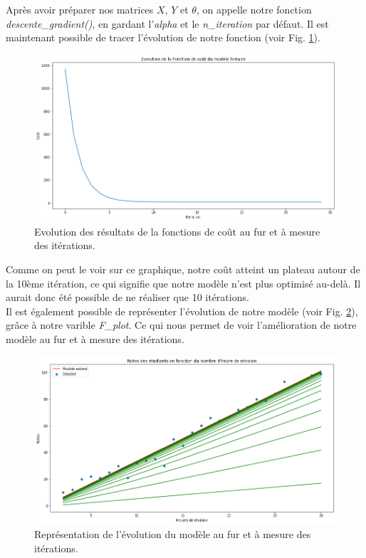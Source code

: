 \documentclass[french]{article}
\begin{document}
\noindent Après avoir préparer nos matrices $X$, $Y$ et $\theta$, on appelle notre fonction \textit{descente\_gradient()}, en gardant l'\textit{alpha} et le \textit{n\_iteration} par défaut. Il est maintenant possible de tracer l'évolution de notre fonction (voir Fig. \ref{fig:JMLS}). 

\begin{figure}[!htbp]
    \centering
    \includegraphics[width=\textwidth]{Rapport/images/cout_MLS.png}
    \caption{Evolution des résultats de la fonctions de coût au fur et à mesure des itérations.}
    \label{fig:JMLS}
\end{figure}

Comme on peut le voir sur ce graphique, notre coût atteint un plateau autour de la 10ème itération, ce qui signifie que notre modèle n'est plus optimisé au-delà. Il aurait donc été possible de ne réaliser que 10 itérations.\\

Il est également possible de représenter l'évolution de notre modèle (voir Fig. \ref{fig:evo_MLS}), grâce à notre varible \textit{F\_plot}. Ce qui nous permet de voir l'amélioration de notre modèle au fur et à mesure des itérations.\\

\begin{figure}[!htbp]
    \centering
    \includegraphics[width=\textwidth]{Rapport/images/evo_MLS.png}
    \caption{Représentation de l'évolution du modèle au fur et à mesure des itérations.}
    \label{fig:evo_MLS}
\end{figure}
\end{document}
